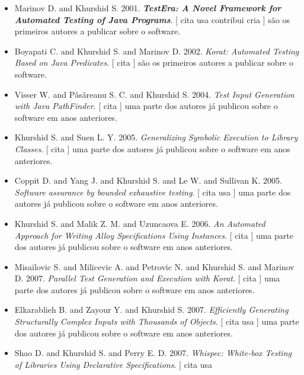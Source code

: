\begin{itemize}
\item Marinov D. and Khurshid S.
      2001.
        \textbf{\textit{ TestEra: A Novel Framework for Automated Testing of Java Programs}}.
      [
          cita
          usa
          contribui
          cria
      ]
são os primeiros autores a publicar sobre o software.
\item Boyapati C. and Khurshid S. and Marinov D.
      2002.
        \textit{ Korat: Automated Testing Based on Java Predicates}.
      [
          cita
      ]
são os primeiros autores a publicar sobre o software.
\item Visser W. and P\v{a}s\v{a}reanu S. C. and Khurshid S.
      2004.
        \textit{ Test Input Generation with Java PathFinder}.
      [
          cita
      ]
uma parte dos autores já publicou sobre o software em anos anteriores.
\item Khurshid S. and Suen L. Y.
      2005.
        \textit{ Generalizing Symbolic Execution to Library Classes}.
      [
          cita
      ]
uma parte dos autores já publicou sobre o software em anos anteriores.
\item Coppit D. and Yang J. and Khurshid S. and Le W. and Sullivan K.
      2005.
        \textit{ Software assurance by bounded exhaustive testing}.
      [
          cita
          usa
      ]
uma parte dos autores já publicou sobre o software em anos anteriores.
\item Khurshid S. and Malik Z. M. and Uzuncaova E.
      2006.
        \textit{ An Automated Approach for Writing Alloy Specifications Using Instances}.
      [
          cita
      ]
uma parte dos autores já publicou sobre o software em anos anteriores.
\item Misailovic S. and Milicevic A. and Petrovic N. and Khurshid S. and Marinov D.
      2007.
        \textit{ Parallel Test Generation and Execution with Korat}.
      [
          cita
      ]
uma parte dos autores já publicou sobre o software em anos anteriores.
\item Elkarablieh B. and Zayour Y. and Khurshid S.
      2007.
        \textit{ Efficiently Generating Structurally Complex Inputs with Thousands of Objects}.
      [
          cita
          usa
      ]
uma parte dos autores já publicou sobre o software em anos anteriores.
\item Shao D. and Khurshid S. and Perry E. D.
      2007.
        \textit{ Whispec: White-box Testing of Libraries Using Declarative Specifications}.
      [
          cita
          usa

\end{itemize}

